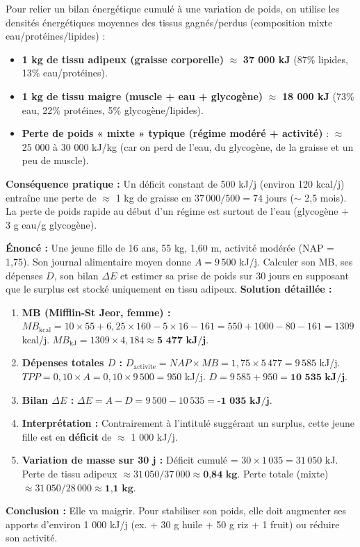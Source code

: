 \documentclass[11pt]{article}
\begin{document}
\begin{propriete}
Pour relier un bilan énergétique cumulé à une variation de poids, on utilise les densités énergétiques moyennes des tissus gagnés/perdus (composition mixte eau/protéines/lipides) :
\begin{itemize}
    \item \textbf{1 kg de tissu adipeux (graisse corporelle)} $\approx$ \textbf{37 000 kJ} (87\% lipides, 13\% eau/protéines).
    \item \textbf{1 kg de tissu maigre (muscle + eau + glycogène)} $\approx$ \textbf{18 000 kJ} (73\% eau, 22\% protéines, 5\% glycogène/lipides).
    \item \textbf{Perte de poids « mixte » typique (régime modéré + activité)} : $\approx$ 25 000 à 30 000 kJ/kg (car on perd de l'eau, du glycogène, de la graisse et un peu de muscle).
\end{itemize}
\textbf{Conséquence pratique :} Un déficit constant de 500 kJ/j (environ 120 kcal/j) entraîne une perte de $\approx$ 1 kg de graisse en $37\,000 / 500 = 74$ jours ($\sim$ 2,5 mois). La perte de poids rapide au début d'un régime est surtout de l'eau (glycogène + 3 g eau/g glycogène).
\end{propriete}

\begin{exoresolu}
\textbf{Énoncé :} Une jeune fille de 16 ans, 55 kg, 1,60 m, activité modérée (NAP = 1,75). Son journal alimentaire moyen donne $A = 9\,500$ kJ/j. Calculer son MB, ses dépenses $D$, son bilan $\Delta E$ et estimer sa prise de poids sur 30 jours en supposant que le surplus est stocké uniquement en tissu adipeux.
\textbf{Solution détaillée :}
\begin{enumerate}
    \item \textbf{MB (Mifflin-St Jeor, femme) :}
    $MB_{\text{kcal}} = 10\times55 + 6,25\times160 - 5\times16 - 161 = 550 + 1000 - 80 - 161 = 1309$ kcal/j.
    $MB_{\text{kJ}} = 1309 \times 4,184 \approx \textbf{5 477 kJ/j}$.
    \item \textbf{Dépenses totales $D$ :}
    $D_{\text{activite}} = NAP \times MB = 1,75 \times 5\,477 = 9\,585$ kJ/j.
    $TPP = 0,10 \times A = 0,10 \times 9\,500 = 950$ kJ/j.
    $D = 9\,585 + 950 = \textbf{10 535 kJ/j}$.
    \item \textbf{Bilan $\Delta E$ :}
    $\Delta E = A - D = 9\,500 - 10\,535 = \textbf{-1 035 kJ/j}$.
    \item \textbf{Interprétation :} Contrairement à l'intitulé suggérant un surplus, cette jeune fille est en \textbf{déficit} de $\approx$ 1 000 kJ/j.
    \item \textbf{Variation de masse sur 30 j :}
    Déficit cumulé = $30 \times 1\,035 = 31\,050$ kJ.
    Perte de tissu adipeux $\approx 31\,050 / 37\,000 \approx \textbf{0,84 kg}$.
    Perte totale (mixte) $\approx 31\,050 / 28\,000 \approx \textbf{1,1 kg}$.
\end{enumerate}
\textbf{Conclusion :} Elle va maigrir. Pour stabiliser son poids, elle doit augmenter ses apports d'environ 1 000 kJ/j (ex. + 30 g huile + 50 g riz + 1 fruit) ou réduire son activité.
\end{exoresolu}
\end{document}
